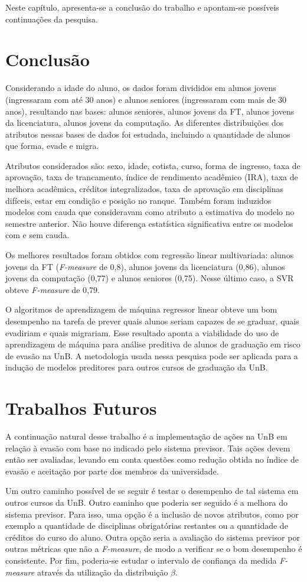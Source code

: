 Neste capítulo, apresenta-se a conclusão do trabalho e apontam-se possíveis continuações da
pesquisa. 

\section{Conclusão}
Considerando a idade do aluno, os dados foram divididos em alunos jovens (ingressaram
com até 30 anos) e alunos seniores (ingressaram com mais de 30 anos), resultando nas
bases: alunos seniores, alunos jovens da FT, alunos jovens da licenciatura, alunos
jovens da computação. As diferentes distribuições dos atributos nessas bases de dados
foi estudada, incluindo a quantidade de alunos que forma, evade e migra. 
\par Atributos considerados são: sexo, idade, cotista, curso, forma de ingresso, taxa
de aprovação, taxa de trancamento, índice de rendimento acadêmico (IRA), taxa de
melhora acadêmica, créditos integralizados, taxa de aprovação em disciplinas
difíceis, estar em condição e posição no ranque. Também foram induzidos modelos com
cauda que consideravam como atributo a estimativa do modelo no semestre anterior. Não
houve diferença estatística significativa entre os modelos com e sem cauda. 
\par Os melhores resultados foram obtidos com regressão linear multivariada: alunos
jovens da FT (\textit{F-measure} de 0,8), alunos jovens da licenciatura (0,86), alunos jovens
da computação (0,77) e alunos seniores (0,75). Nesse último caso, a SVR obteve
\textit{F-measure} de 0,79. 

O algoritmos de aprendizagem de máquina regressor linear obteve um bom desempenho na
tarefa de prever quais alunos seriam capazes de se graduar, quais evadiriam e quais
migrariam. Esse resultado aponta a viabilidade do uso de
aprendizagem de máquina para análise preditiva de alunos de graduação em risco de
evasão na UnB. A metodologia usada nessa pesquisa pode ser aplicada para a indução de
modelos preditores para outros cursos de graduação da UnB. 

\section{Trabalhos Futuros}
A continuação natural desse trabalho é a implementação de ações na UnB em
relação à evasão com base no indicado pelo sistema previsor. Tais ações devem então
ser avaliadas, levando em conta questões como redução obtida no índice de evasão 
e aceitação por parte dos membros da universidade. 
\par Um outro caminho possível de se seguir é testar o desempenho de tal sistema em
outros cursos da UnB. Outro caminho que poderia ser seguido é a melhora do
sistema previsor. Para isso, uma opção é a inclusão de novos atributos, como por
exemplo a quantidade de disciplinas obrigatórias restantes ou a quantidade de
créditos do curso do aluno.  Outra opção seria a avaliação do sistema previsor por
outras métricas que não a \textit{F-measure}, de modo a verificar se o bom desempenho
é consistente. Por fim, poderia-se estudar o intervalo de confiança da medida
\textit{F-measure} através da utilização da distribuição $\beta$. 

%
